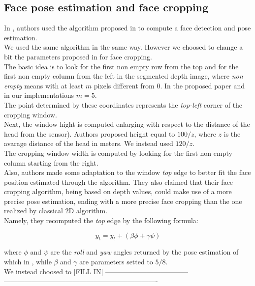 \documentclass{article}
\begin{document}
\subsection{Face pose estimation and face cropping}
\label{sec:cropping}
In \citep{Hayat2016}, authors used the algorithm proposed in \citep{Fanelli2011}
to compute a face detection and pose estimation.
\\
We used the same algorithm in the same way. However we choosed to change a bit
the parameters proposed in \citep{Hayat2016} for face cropping.
\\
The basic idea is to look for the first non empty row from the top and for the
first non empty column from the left in the segmented depth image, where
\textit{non empty} means with at least $m$ pixels different from $0$. In the
proposed paper and in our implementations $m = 5$.
\\
The point determined by these coordinates represents the \textit{top-left}
corner of the cropping window.
\\
Next, the window hight is computed enlarging with respect to the distance of
the head from the sensor). Authors proposed height equal to $100/z$, where $z$
is the avarage distance of the head in meters. We instead used $120/z$.
\\
The cropping window width is computed by looking for the first non empty column
starting from the right.
\\
Also, authors made some adaptation to the window \textit{top} edge to better
fit the face position estimated through the algorithm. They also claimed that
their face cropping algorithm, being based on depth values, could make use of a
more precise pose estimation, ending with a more precise face cropping than the
one realized by classical 2D algorithm.
\\
Namely, they recomputed the \textit{top} edge by the following formula:

$$y_t = y_t + (\beta \phi +\gamma \psi)$$

where $\phi$ and $\psi$ are the \textit{roll} and \textit{yaw} angles returned
by the pose estimation of which in \citep{Fanelli2011}, while $\beta$ and
$\gamma$ are parameters setted to $5/8$.
\\
We instead choosed to [FILL IN] ------------------------------------
-------------------------------------------------------------------
\\
\end{document}
